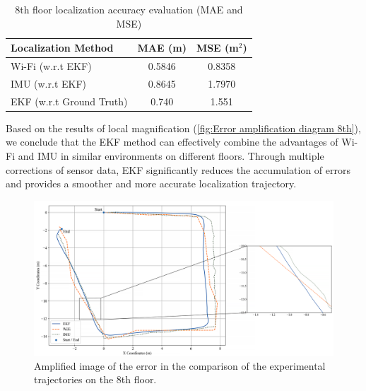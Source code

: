 \documentclass[12pt,a4paper]{article}
\numberwithin{equation}{section}
\begin{document}
\begin{table}[H]
\caption{8th floor localization accuracy evaluation (MAE and MSE)}
\label{tab:8thfloor_error}
\centering
\begin{tabular}{lcc}
\toprule
\textbf{Localization Method} & \textbf{MAE (m)} & \textbf{MSE (m$^2$)} \\
\midrule
Wi-Fi (w.r.t EKF) & 0.5846 & 0.8358 \\
IMU (w.r.t EKF) & 0.8645 & 1.7970 \\
EKF (w.r.t Ground Truth) & 0.740 & 1.551 \\
\bottomrule
\end{tabular}
\end{table}
\noindent Based on the results of local magnification (\autoref{fig:Error amplification diagram 8th}), we conclude that the EKF method can effectively combine the advantages of Wi-Fi and IMU in similar environments on different floors. Through multiple corrections of sensor data, EKF significantly reduces the accumulation of errors and provides a smoother and more accurate localization trajectory.
\begin{figure}[H]
    \centering
    \includegraphics[width=1\linewidth]{Amplification images/wifi/half_circle.png}
    \caption{Amplified image of the error in the comparison of the experimental trajectories on the 8th floor.}
    \label{fig:Error amplification diagram 8th}
\end{figure}
\end{document}
